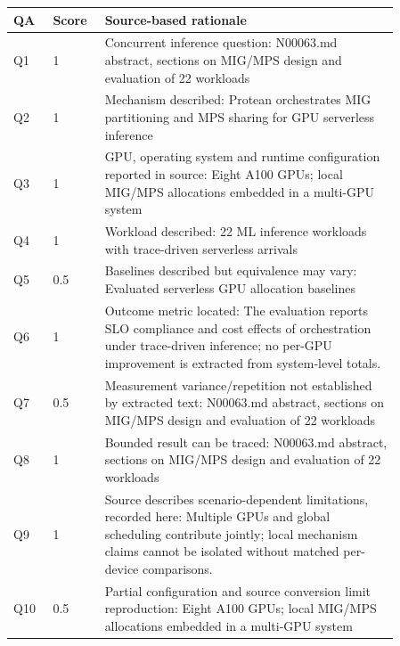 \begin{longtable}{P{0.09\linewidth}P{0.10\linewidth}P{0.67\linewidth}}
\toprule QA & Score & Source-based rationale\\\midrule\endhead
Q1 & 1 & Concurrent inference question: N00063.md abstract, sections on MIG/MPS design and evaluation of 22 workloads\\
Q2 & 1 & Mechanism described: Protean orchestrates MIG partitioning and MPS sharing for GPU serverless inference\\
Q3 & 1 & GPU, operating system and runtime configuration reported in source: Eight A100 GPUs; local MIG/MPS allocations embedded in a multi-GPU system\\
Q4 & 1 & Workload described: 22 ML inference workloads with trace-driven serverless arrivals\\
Q5 & 0.5 & Baselines described but equivalence may vary: Evaluated serverless GPU allocation baselines\\
Q6 & 1 & Outcome metric located: The evaluation reports SLO compliance and cost effects of orchestration under trace-driven inference; no per-GPU improvement is extracted from system-level totals.\\
Q7 & 0.5 & Measurement variance/repetition not established by extracted text: N00063.md abstract, sections on MIG/MPS design and evaluation of 22 workloads\\
Q8 & 1 & Bounded result can be traced: N00063.md abstract, sections on MIG/MPS design and evaluation of 22 workloads\\
Q9 & 1 & Source describes scenario-dependent limitations, recorded here: Multiple GPUs and global scheduling contribute jointly; local mechanism claims cannot be isolated without matched per-device comparisons.\\
Q10 & 0.5 & Partial configuration and source conversion limit reproduction: Eight A100 GPUs; local MIG/MPS allocations embedded in a multi-GPU system\\
\bottomrule\end{longtable}

